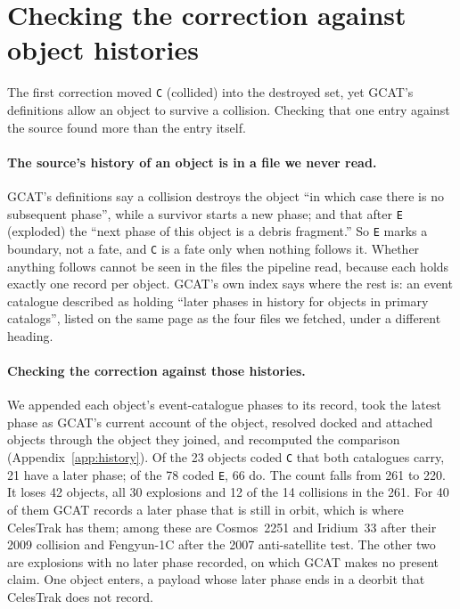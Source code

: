\section{Checking the correction against object histories}
\label{sec:second}

The first correction moved \texttt{C} (collided) into the destroyed set, yet
GCAT's definitions allow an object to survive a collision. Checking that one
entry against the source found more than the entry itself.

\paragraph{The source's history of an object is in a file we never read.}
GCAT's definitions say a collision destroys the object ``in which case there is
no subsequent phase'', while a survivor starts a new phase; and that after
\texttt{E} (exploded) the ``next phase of this object is a debris fragment.''
So \texttt{E} marks a boundary, not a fate, and \texttt{C} is a fate only when
nothing follows it. Whether anything follows cannot be seen in the files the
pipeline read, because each holds exactly one record per object. GCAT's own
index says where the rest is: an event catalogue described as holding ``later
phases in history for objects in primary catalogs'', listed on the same page as
the four files we fetched, under a different heading.

\paragraph{Checking the correction against those histories.}
We appended each object's event-catalogue phases to its record, took the latest
phase as GCAT's current account of the object, resolved docked and attached
objects through the object they joined, and recomputed the comparison
(Appendix~\ref{app:history}). Of the 23 objects coded \texttt{C} that both
catalogues carry, 21 have a later phase; of the 78 coded \texttt{E}, 66 do. The
count falls from 261 to 220. It loses 42 objects, all 30 explosions and 12 of the
14 collisions in the 261. For 40 of them GCAT records a later phase that is still
in orbit, which is where CelesTrak has them; among these are Cosmos~2251 and
Iridium~33 after their 2009 collision and Fengyun-1C after the 2007
anti-satellite test. The other two are explosions with no later phase recorded,
on which GCAT makes no present claim. One object enters, a payload whose later
phase ends in a deorbit that CelesTrak does not record.

